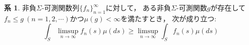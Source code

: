 \documentclass{jsreport}
\theoremstyle{definition}
\newtheorem{cor}[defi]{系}
\begin{document}
\begin{cor}\label{reverse_Fatou_lemma}
非負$\Sigma$-可測関数列$\{f_n\}_{n=1}^\infty$に対して，
ある非負$\Sigma$-可測関数$g$が存在して
$f_n \leq g\ (n=1,2,\cdots)$かつ$\mu(g)<\infty$を満たすとき，
次が成り立つ:
\[ \int_S\limsup_{n\to\infty}f_n(s)\mu(ds)\geq\limsup_{n\to\infty}\int_S f_n(s)\mu(ds) \]
\end{cor}

\end{document}
